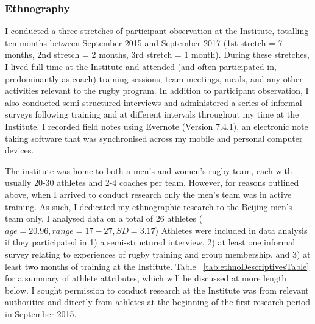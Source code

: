 \begin{CJK}{UTF8}{gbsn}
\subsubsection{Ethnography}
I conducted a three stretches of participant observation at the Institute, totalling ten months between September 2015 and September 2017 (1st stretch = 7 months, 2nd stretch = 2 months, 3rd stretch = 1 month).  During these stretches, I lived full-time at the Institute and attended (and often participated in, predominantly as coach) training sessions, team meetings, meals, and any other activities relevant to the rugby program.  In addition to participant observation, I also conducted semi-structured interviews and administered a series of informal surveys following training and at different intervals throughout my time at the Institute.  I recorded field notes using Evernote (Version 7.4.1), an electronic note taking software that was synchronised across my mobile and personal computer devices.

The institute was home to both a men's and women's rugby team, each with usually 20-30 athletes and 2-4 coaches per team.  However, for reasons outlined above, when I arrived to conduct research only the men's team was in active training.  As such, I dedicated my ethnographic research to the Beijing men's team only.  I analysed data on a total of 26 athletes ($age = 20.96, range = 17-27, SD = 3.17$)   Athletes were included in data analysis if they participated in 1) a semi-structured interview, 2) at least one informal survey relating to experiences of rugby training and group membership, and 3) at least two months of training at the Institute. Table ~\ref{tab:ethnoDescriptivesTable} for a summary of athlete attributes, which will be discussed at more length below.  I sought permission to conduct research at the Institute was from relevant authorities and directly from athletes at the beginning of the first research period in September 2015.




\end{CJK}
